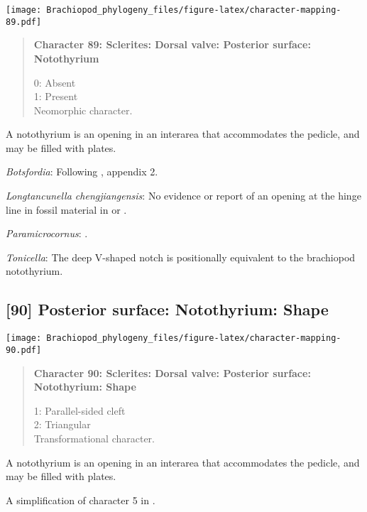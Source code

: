 \documentclass[openany]{book}
\theoremstyle{definition}
\theoremstyle{definition}
\theoremstyle{definition}
\theoremstyle{remark}
\begin{document}
\texttt{[image: Brachiopod\_phylogeny\_files/figure-latex/character-mapping-89.pdf]}

\begin{quote}
\textbf{Character 89: Sclerites: Dorsal valve: Posterior surface:
Notothyrium}

0: Absent\\
1: Present\\
Neomorphic character.
\end{quote}

A notothyrium is an opening in an interarea that accommodates the
pedicle, and may be filled with plates.

\hypertarget{Botsfordia-coding-89}{}
\emph{Botsfordia}: Following \citet{Williams1998Thediversity}, appendix
2.

\hypertarget{Longtancunella_chengjiangensis-coding-89}{}
\emph{Longtancunella chengjiangensis}: No evidence or report of an
opening at the hinge line in fossil material in
\citet{Zhang2007Agregarious} or \citet{Zhang2011Theexceptionally}.

\hypertarget{Paramicrocornus-coding-89}{}
\emph{Paramicrocornus}: \citet{Zhang2018Ahyolithid}.

\hypertarget{Tonicella-coding-89}{}
\emph{Tonicella}: The deep V-shaped notch \citep[fig. 8]{Schwabe2010} is
positionally equivalent to the brachiopod notothyrium.

\subsection*{{[}90{]} Posterior surface: Notothyrium:
Shape}\label{posterior-surface-notothyrium-shape}

\texttt{[image: Brachiopod\_phylogeny\_files/figure-latex/character-mapping-90.pdf]}

\begin{quote}
\textbf{Character 90: Sclerites: Dorsal valve: Posterior surface:
Notothyrium: Shape}

1: Parallel-sided cleft\\
2: Triangular\\
Transformational character.
\end{quote}

A notothyrium is an opening in an interarea that accommodates the
pedicle, and may be filled with plates.

A simplification of character 5 in
\citet{Bassett2001Functionalmorphology}.
\end{document}
